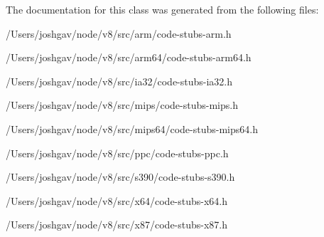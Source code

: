 The documentation for this class was generated from the following files\+:\begin{DoxyCompactItemize}
\item 
/\+Users/joshgav/node/v8/src/arm/code-\/stubs-\/arm.\+h\item 
/\+Users/joshgav/node/v8/src/arm64/code-\/stubs-\/arm64.\+h\item 
/\+Users/joshgav/node/v8/src/ia32/code-\/stubs-\/ia32.\+h\item 
/\+Users/joshgav/node/v8/src/mips/code-\/stubs-\/mips.\+h\item 
/\+Users/joshgav/node/v8/src/mips64/code-\/stubs-\/mips64.\+h\item 
/\+Users/joshgav/node/v8/src/ppc/code-\/stubs-\/ppc.\+h\item 
/\+Users/joshgav/node/v8/src/s390/code-\/stubs-\/s390.\+h\item 
/\+Users/joshgav/node/v8/src/x64/code-\/stubs-\/x64.\+h\item 
/\+Users/joshgav/node/v8/src/x87/code-\/stubs-\/x87.\+h\end{DoxyCompactItemize}

